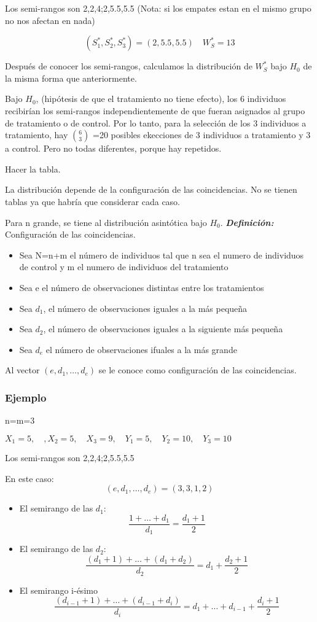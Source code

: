 Los semi-rangos son 2,2,4;2,5.5,5.5
(Nota: si los empates estan en el mismo grupo no nos afectan en nada)

\[
(S_1^*,S_2^*,S_3^*)=(2,5.5,5.5) \quad W_S^*=13
\]

Después de conocer los semi-rangos, calculamos la distribución de $W_S^*$ bajo $H_0$ de la misma forma que anteriormente.

Bajo $H_0$, (hipótesis de que el tratamiento no tiene efecto), los 6 individuos recibirían los semi-rangos independientemente de que fueran asignados al grupo de tratamiento o de control. Por lo tanto, para la selección de los 3 individuos a tratamiento, hay $\binom{6}{3}$
=20 posibles ekecciones de 3 individuos a tratamiento y 3 a control. Pero no todas diferentes, porque hay repetidos.


Hacer la tabla.

La distribución depende de la configuración de las coincidencias. No se tienen tablas ya que habría que considerar cada caso.

Para n grande, se tiene al distribución asintótica bajo $H_0$.
\textit{\textbf{Definición: }}Configuración de las coincidencias. 
\begin{itemize}
    \item Sea N=n+m el número de individuos tal que n sea el numero de individuos de control y m el numero de individuos del tratamiento
    \item Sea e el número de observaciones distintas entre los tratamientos
    \item Sea $d_1$, el número de observaciones iguales a la más pequeña
    \item Sea $d_2$, el número de observaciones iguales a la siguiente más pequeña
    \item Sea $d_e$ el número de observaciones ifuales a la más grande
\end{itemize}

Al vector $(e,d_1,\dots,d_e)$ se le conoce como configuración de las coincidencias.

\subsubsection*{Ejemplo}
n=m=3

\(
X_1=5, \quad, X_2=5, \quad X_3=9, \quad Y_1=5,\quad Y_2=10,\quad Y_3=10
\)

Los semi-rangos son 2,2,4;2,5.5,5.5

En este caso:
\[
(e,d_1,\dots,d_e)=(3,3,1,2)
\]
\begin{itemize}
    \item El semirango de las $d_1$:
    \[
    \frac{1+\dots+d_1}{d_1}=\frac{d_1+1}{2}
    \]
    \item El semirango de las $d_2$:
    \[
    \frac{(d_1+1)+\dots+(d_1+d_2)}{d_2}=d_1+\frac{d_2+1}{2}
    \]
    \item El semirango i-ésimo
    \[
    \frac{(d_{i-1}+1)+\dots+(d_{i-1}+d_i)}{d_i}=d_1+\dots+d_{i-1}+\frac{d_i+1}{2}
    \]
\end{itemize}

